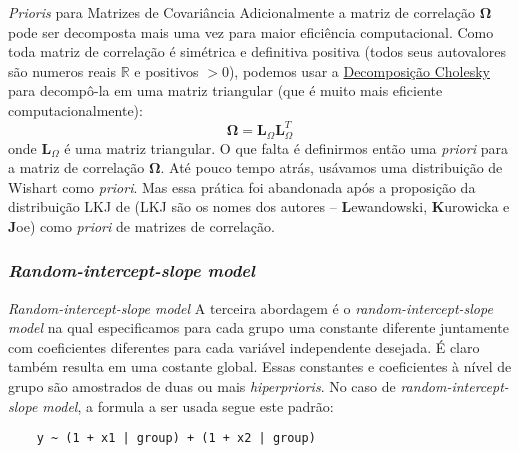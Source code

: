 \begin{frame}{\textit{Prioris} para Matrizes de Covariância}
  \small
  Adicionalmente a matriz de correlação $\boldsymbol{\Omega}$
  pode ser decomposta mais uma vez para maior eficiência computacional.
  Como toda matriz de correlação é simétrica e definitiva positiva
  (todos seus autovalores são numeros reais $\mathbb{R}$ e positivos $>0$),
  podemos usar a \href{https://en.wikipedia.org/wiki/Cholesky_decomposition}{Decomposição
  Cholesky} para decompô-la em uma matriz triangular
  (que é muito mais eficiente computacionalmente):
  $$
  \boldsymbol{\Omega} = \mathbf{L}_\Omega \mathbf{L}^T_\Omega
  $$
  onde $\mathbf{L}_\Omega$ é uma matriz triangular.
  \vfill
  O que falta é definirmos então uma \textit{priori} para a matriz de correlação
  $\boldsymbol{\Omega}$. Até pouco tempo atrás, usávamos uma distribuição de
  Wishart como \textit{priori}\parencite{gelman2013bayesian}. Mas essa prática foi
  abandonada após a proposição da distribuição LKJ de \textcite{lewandowski2009generating}
  (LKJ são os nomes dos autores -- \textbf{L}ewandowski, \textbf{K}urowicka e \textbf{J}oe)
  como \textit{priori} de matrizes de correlação.
\end{frame}

\subsubsection{\textit{Random-intercept-slope model}}
\begin{frame}[fragile]{\textit{Random-intercept-slope model}}
  A terceira abordagem é o \textit{random-intercept-slope model} na qual
  especificamos para cada grupo uma constante diferente juntamente com coeficientes
  diferentes para cada variável independente desejada.
  É claro também resulta em uma costante global.
  Essas constantes e coeficientes à nível de grupo são amostrados de
  duas ou mais \textit{hiperprioris}.
  \vfill
  No caso de \textit{random-intercept-slope model}, a formula a ser usada segue este padrão:
  \begin{lstlisting}
    y ~ (1 + x1 | group) + (1 + x2 | group)
  \end{lstlisting}
\end{frame}


